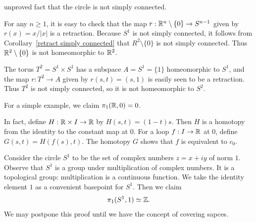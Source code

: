 unproved fact that the circle is not simply connected.
\begin{example}
For any $n\geq1$, it is easy to check that the map $r:\mathbb{R}^n\setminus\{0\}\to S^{n-1}$ given by $r(x)=x/|x|$ is a retraction. Because $S^1$ is not simply connected, it follows from Corollary~\ref{retract simply connected} that $R^2\setminus\{0\}$ is not simply connected. Thus $\mathbb{R}^2\setminus\{0\}$ is not
homeomorphic to $\mathbb{R}^2$.
\end{example}
\begin{example}
The torus $T^2=S^1\times S^1$ has a subspace $A=S^1=\{1\}$ homeomorphic to $S^1$, and the map $r:T^2\to A$ given by $r(s,t)=(s,1)$ is easily seen to be a retraction. Thus $T^2$ is not simply connected, so it is not homeomorphic
to $S^2$.
\end{example}
\begin{example}
For a simple example, we claim $\pi_1(\mathbb{R},0)=0$.\par
In fact, define $H:\mathbb{R}\times I\to\mathbb{R}$ by $H(s,t)=(1-t)s$. Then $H$ is a homotopy
from the identity to the constant map at $0$. For a loop $f:I\to\mathbb{R}$ at $0$, define $G(s,t)=H(f(s),t)$. The homotopy $G$ shows that $f$ is equivalent to $c_0$.
\end{example}
\begin{example}
Consider the circle $S^1$ to be the set of complex numbers $z=x+iy$ of norm $1$. Observe that $S^1$ is a group under multiplication of complex numbers. It is a topological group: multiplication is a continuous function. We take the identity element $1$ as a convenient basepoint for $S^1$. Then we claim
\[\pi_1(S^1,1)\simeq\mathbb{Z}.\]
We may postpone this proof until we have the concept of covering sapces.
\end{example}
